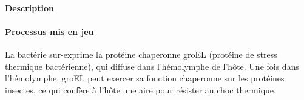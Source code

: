 \paragraph{Description} %
\label{par:buchnera_description}


\cite{dunbar2007}

\paragraph{Processus mis en jeu} %
\label{par:buchnera_process}

La bactérie sur-exprime la protéine chaperonne groEL (protéine de stress
thermique bactérienne), qui diffuse dans l'hémolymphe de l'hôte. Une fois dans l'hémolymphe, groEL peut exercer sa fonction chaperonne sur les protéines insectes, ce qui confère à l'hôte une aire pour résister au choc thermique.
